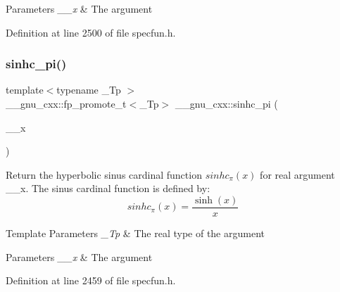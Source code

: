 \begin{DoxyParams}{Parameters}
{\em \+\_\+\+\_\+x} & The argument \\
\hline
\end{DoxyParams}


Definition at line 2500 of file specfun.\+h.

\mbox{\label{group__gnu__math__spec__func_ga8bb6034e28d48879845bf64818cc06e1}} 
\subsubsection{\texorpdfstring{sinhc\+\_\+pi()}{sinhc\_pi()}}
{\footnotesize\ttfamily template$<$typename \+\_\+\+Tp $>$ \\
\+\_\+\+\_\+gnu\+\_\+cxx\+::fp\+\_\+promote\+\_\+t$<$\+\_\+\+Tp$>$ \+\_\+\+\_\+gnu\+\_\+cxx\+::sinhc\+\_\+pi (\begin{DoxyParamCaption}\item[{\+\_\+\+Tp}]{\+\_\+\+\_\+x }\end{DoxyParamCaption})\hspace{0.3cm}{\ttfamily [inline]}}

Return the hyperbolic sinus cardinal function $ sinhc_\pi(x) $ for real argument {\ttfamily \+\_\+\+\_\+x}. The sinus cardinal function is defined by\+: \[ sinhc_\pi(x) = \frac{\sinh(x)}{x} \]


\begin{DoxyTemplParams}{Template Parameters}
{\em \+\_\+\+Tp} & The real type of the argument \\
\hline
\end{DoxyTemplParams}

\begin{DoxyParams}{Parameters}
{\em \+\_\+\+\_\+x} & The argument \\
\hline
\end{DoxyParams}


Definition at line 2459 of file specfun.\+h.

\mbox{\label{group__gnu__math__spec__func_ga26e54504db6541550266140f5264acbe}} 
